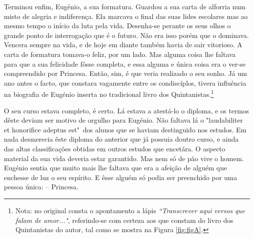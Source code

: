 \documentclass[9pt]{article}
\begin{document}
Terminou enfim, Eugé\-nio, a sua formatura. Guardou a sua carta de alforria
num misto de alegria e indiferença. Ela marcava o final das suas lides escolares mas ao mesmo tempo o início da luta pela vida. Desenha-se perante os seus o\-lhos o gran\-de ponto de interroga\-ção que é o futuro. Não era isso porém que o dominava. Vencera sempre na vida, e de
hoje em diante também havia de sair vitorioso. A carta de formatura
tomava-o feliz, por um lado. Mas alguma coisa lhe faltava para que
a sua felicidade fôsse completa, e essa alguma e única coisa era o
ver-se compreendido por Princesa. Então, sim, é que veria realizado o
seu sonho.
Já um ano antes o facto, que constara vagamente entre os condiscíplos, tivera influência na biografia de Eugé\-nio inserta no tradicional livro dos Quintanistas.\footnote{Nota: no original consta o apontamento a lápis \emph{“Transcrever aqui versos que falam de amor..."}, referindo-se com certeza aos que constam do livro dos Quintanistas do autor, tal como se mostra na Figura \ref{fig:figA}.}

\figA

\def\OMITIDOS{
\begin{quote}\small
“Vinde a vê-lo, cachopas, vinde a vê-lo,
\\
Este jovem, simpático Doutor!
\\
Q’ às difíceis manobras d’escalpelo,
\\
Junta ainda... umas práticas d'amor!

Correi a vê-lo! e reparai atentas,
\\
Do seu andar na angélica maneira,
\\
Nas galochas sem bri\-lho, poeirentas,
\\
Tão próprias ao Dr.\ Lopes Parreira!

Tem medo à água...  e gestos delicados...
\\
Uns languidos requebros, completados
\\
Pelas voltas qu’imprime ao guarda-chuva

Que vem a ser, co’as galochas despolidas
\\
As duas coisas para êle mais queridas
\\
E fi\-cam, ao perfil, como uma luva.”
\end{quote}
}

O seu curso estava completo, é certo. Lá estava a atestá-lo o diploma, e os termos dêste deviam ser motivo de orgu\-lho para Eugé\-nio. Não
faltava lá o "laudabiliter et honorifice adeptus est"\ dos alunos
que se haviam destinguido nos estudos. Em nada desmerecia êste diploma do anterior que já possuia doutro curso, e ainda das altas classifi\-ca\-ções obtidas em outros estudos que encetára. O aspecto material
da sua vida deveria estar garantido. Mas nem só de pão vive o homem.
Eugé\-nio sentia que muito mais lhe faltava que era a afei\-ção de alguém
que enchesse de luz o seu espírito. E êsse alguém só podia ser preenchido por uma pessoa única: -- Princesa.
\end{document}
